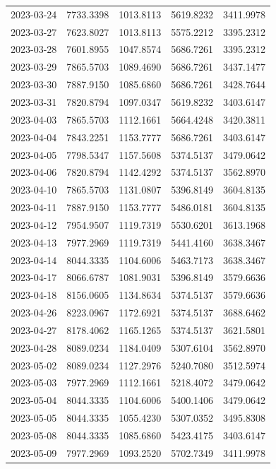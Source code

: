 {\begin{longtable}{lllll}
2023-03-24 & 7733.3398 & 1013.8113 & 5619.8232 & 3411.9978 \\
2023-03-27 & 7623.8027 & 1013.8113 & 5575.2212 & 3395.2312 \\
2023-03-28 & 7601.8955 & 1047.8574 & 5686.7261 & 3395.2312 \\
2023-03-29 & 7865.5703 & 1089.4690 & 5686.7261 & 3437.1477 \\
2023-03-30 & 7887.9150 & 1085.6860 & 5686.7261 & 3428.7644 \\
2023-03-31 & 7820.8794 & 1097.0347 & 5619.8232 & 3403.6147 \\
2023-04-03 & 7865.5703 & 1112.1661 & 5664.4248 & 3420.3811 \\
2023-04-04 & 7843.2251 & 1153.7777 & 5686.7261 & 3403.6147 \\
2023-04-05 & 7798.5347 & 1157.5608 & 5374.5137 & 3479.0642 \\
2023-04-06 & 7820.8794 & 1142.4292 & 5374.5137 & 3562.8970 \\
2023-04-10 & 7865.5703 & 1131.0807 & 5396.8149 & 3604.8135 \\
2023-04-11 & 7887.9150 & 1153.7777 & 5486.0181 & 3604.8135 \\
2023-04-12 & 7954.9507 & 1119.7319 & 5530.6201 & 3613.1968 \\
2023-04-13 & 7977.2969 & 1119.7319 & 5441.4160 & 3638.3467 \\
2023-04-14 & 8044.3335 & 1104.6006 & 5463.7173 & 3638.3467 \\
2023-04-17 & 8066.6787 & 1081.9031 & 5396.8149 & 3579.6636 \\
2023-04-18 & 8156.0605 & 1134.8634 & 5374.5137 & 3579.6636 \\
2023-04-26 & 8223.0967 & 1172.6921 & 5374.5137 & 3688.6462 \\
2023-04-27 & 8178.4062 & 1165.1265 & 5374.5137 & 3621.5801 \\
2023-04-28 & 8089.0234 & 1184.0409 & 5307.6104 & 3562.8970 \\
2023-05-02 & 8089.0234 & 1127.2976 & 5240.7080 & 3512.5974 \\
2023-05-03 & 7977.2969 & 1112.1661 & 5218.4072 & 3479.0642 \\
2023-05-04 & 8044.3335 & 1104.6006 & 5400.1406 & 3479.0642 \\
2023-05-05 & 8044.3335 & 1055.4230 & 5307.0352 & 3495.8308 \\
2023-05-08 & 8044.3335 & 1085.6860 & 5423.4175 & 3403.6147 \\
2023-05-09 & 7977.2969 & 1093.2520 & 5702.7349 & 3411.9978 \\

\end{longtable}}
